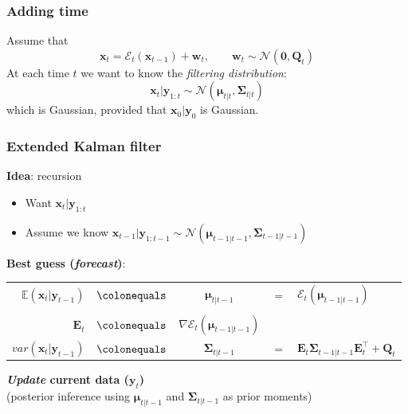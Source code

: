 \documentclass[usenames,dvipsnames,svgnames,table]{beamer}
\newcommand{\bE}{\mathbf{E}}
\newcommand{\bx}{\mathbf{x}}
\newcommand{\by}{\mathbf{y}}
\newcommand{\bw}{\mathbf{w}}
\newcommand{\bQ}{\mathbf{Q}}
\newcommand{\bfzero}{\mathbf{0}}
\newcommand{\bfmu}{\bm{\mu}}
\newcommand{\bfSigma}{\bm{\Sigma}}
\newcommand{\var}{var}
\newcommand{\evol}{\mathcal{E}}
\newcommand{\levol}{\mathbf{E}}
\newcommand{\normal}{\mathcal{N}}
\begin{document}
\begin{frame}
	\frametitle{Adding time}
	Assume that 
	$$
	\bx_t = \mathcal{E}_t(\bx_{t-1}) + \bw_t, \quad \quad \bw_t \sim \normal(\bfzero, \bQ_t)
	$$
	At each time $t$ we want to know the \emph{filtering distribution}:
	$$
	\bx_t | \by_{1:t} \sim \normal(\bfmu_{t|t}, \bfSigma_{t|t})
	$$
	which is Gaussian, provided that $\bx_0 | \by_0$ is Gaussian.
\end{frame}





\begin{frame}
	\frametitle{Extended Kalman filter}
	\textbf{Idea}: recursion
	\begin{itemize}
		\item Want $\bx_t|\by_{1:t}$
		\item Assume we know $\bx_{t-1}|\by_{1:t-1} \sim \normal(\bfmu_{t-1|t-1}, \bfSigma_{t-1|t-1})$
	\end{itemize}
	\vfill
	\textbf{Best guess (\emph{forecast})}: \\
	\vfill
	\begin{tabular}{rcccl}
		$\mathbb{E}(\bx_t| \by_{t-1})$ & $\colonequals$ & $\bfmu_{t|t-1}$  & $=$ & $\evol_t(\bfmu_{t-1|t-1})$ \\
		\\
		$\levol_t$ & $\colonequals$ & $\nabla \evol_t(\bfmu_{t-1|t-1})$ & & \\
		$\var(\bx_t | \by_{t-1})$ & $\colonequals$ & $\bfSigma_{t|t-1}$ & $=$ & $\bE_t \bfSigma_{t-1|t-1} \bE_t^{\top} + \bQ_t$\\
	\end{tabular}
	
	\vspace{1cm}
	\textbf{\emph{Update} current data ($\by_t$)}\\
			(posterior inference using $\bfmu_{t|t-1}$ and $\bfSigma_{t|t-1}$ as prior moments)
\end{frame}
\end{document}
